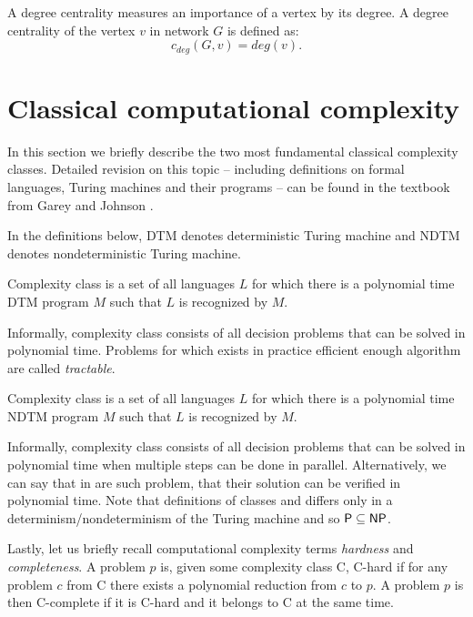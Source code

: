 \begin{definition}
    A degree centrality measures an importance of a vertex by its degree.
    A degree centrality of the vertex $v$ in network $G$ is defined as:
    $$c_{deg}(G, v) = deg(v).$$
\end{definition}


\section{Classical computational complexity}

In this section we briefly describe the two most fundamental classical complexity classes.
Detailed revision on this topic --
including definitions on formal languages, Turing machines and their programs --
can be found in the textbook from Garey and Johnson \cite{Garey1990}.

In the definitions below, DTM denotes deterministic Turing machine
and NDTM denotes nondeterministic Turing machine.

\begin{definition}[\Po]
    Complexity class \Po is a set of all languages $L$ for which there is a polynomial time DTM program $M$
    such that $L$ is recognized by $M$.
\end{definition}

Informally, complexity class \Po consists of all decision problems that can be solved in polynomial time.
Problems for which exists in practice efficient enough algorithm are called \emph{tractable}.

\begin{definition}[\NP]
    Complexity class \NP is a set of all languages $L$ for which there is a polynomial time NDTM program $M$
    such that $L$ is recognized by $M$.
\end{definition}

Informally, complexity class \NP consists of all decision problems that can be solved in polynomial time
when multiple steps can be done in parallel.
Alternatively, we can say that in \NP are such problem, that their solution can be verified in polynomial time.
Note that definitions of classes \Po and \NP differs only in a determinism/nondeterminism of the Turing machine
and so $\textsf{P} \subseteq \textsf{NP}$.

Lastly, let us briefly recall computational complexity terms \emph{hardness} and \emph{completeness}.
A problem $p$ is, given some complexity class \textsf{C}, \textsf{C-hard} if for any problem $c$ from \textsf{C}
there exists a polynomial reduction from $c$ to $p$.
A problem $p$ is then \textsf{C-complete} if it is \textsf{C-hard} and it belongs to \textsf{C} at the same time.


